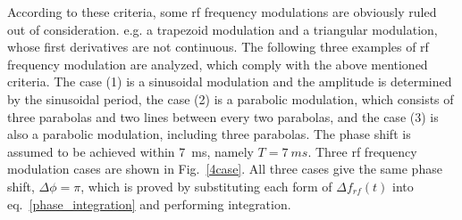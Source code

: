 According to these criteria, some rf frequency modulations are obviously ruled out of consideration. e.g. a trapezoid modulation and a triangular modulation, whose first derivatives are not continuous. The following three examples of rf frequency modulation are analyzed, which comply with the above mentioned criteria. The case (1) is a sinusoidal modulation and the amplitude is determined by the sinusoidal period, the case (2) is a parabolic modulation, which consists of three parabolas and two lines between every two parabolas, and the case (3) is also a parabolic modulation, including three parabolas. The phase shift is assumed to be achieved within \SI{7}{ms}, namely $T=\SI{7}{ms}$. Three rf frequency modulation cases are shown in Fig.~\ref{4case}. All three cases give the same phase shift, $\Delta \phi=\pi$, which is proved by substituting each form of $\Delta f_{rf}(t)$ into eq.~\ref{phase_integration} and performing integration. 

%
%
%
%

